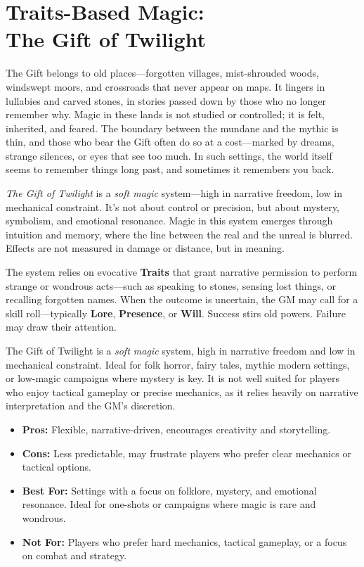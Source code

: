 \section[Traits-Based Magic: The Gift of Twilight]{Traits-Based Magic:\\ The Gift of Twilight}

\begin{Example}{}
    The Gift belongs to old places—forgotten villages, mist-shrouded woods, windswept moors, and crossroads that never appear on maps. It lingers in lullabies and carved stones, in stories passed down by those who no longer remember why. Magic in these lands is not studied or controlled; it is felt, inherited, and feared. The boundary between the mundane and the mythic is thin, and those who bear the Gift often do so at a cost—marked by dreams, strange silences, or eyes that see too much. In such settings, the world itself seems to remember things long past, and sometimes it remembers you back.
\end{Example}

\textit{The Gift of Twilight} is a \emph{soft magic} system—high in narrative freedom, low in mechanical constraint. It’s not about control or precision, but about mystery, symbolism, and emotional resonance. Magic in this system emerges through intuition and memory, where the line between the real and the unreal is blurred. Effects are not measured in damage or distance, but in meaning.

The system relies on evocative \textbf{Traits} that grant narrative permission to perform strange or wondrous acts—such as speaking to stones, sensing lost things, or recalling forgotten names. When the outcome is uncertain, the GM may call for a skill roll—typically \textbf{Lore}, \textbf{Presence}, or \textbf{Will}. Success stirs old powers. Failure may draw their attention.

\begin{GmTips}
    The Gift of Twilight is a \emph{soft magic} system, high in narrative freedom and low in mechanical constraint. Ideal for folk horror, fairy tales, mythic modern settings, or low-magic campaigns where mystery is key. It is not well suited for players who enjoy tactical gameplay or precise mechanics, as it relies heavily on narrative interpretation and the GM’s discretion.
    \begin{itemize}
        \item \textbf{Pros:} Flexible, narrative-driven, encourages creativity and storytelling.
        \item \textbf{Cons:} Less predictable, may frustrate players who prefer clear mechanics or tactical options.
        \item \textbf{Best For:} Settings with a focus on folklore, mystery, and emotional resonance. Ideal for one-shots or campaigns where magic is rare and wondrous.
        \item \textbf{Not For:} Players who prefer hard mechanics, tactical gameplay, or a focus on combat and strategy.
    \end{itemize}
\end{GmTips}

